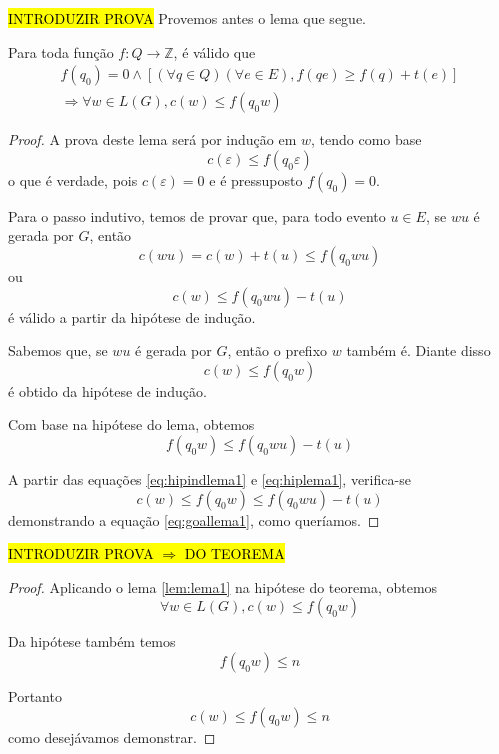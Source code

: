 \hl{INTRODUZIR PROVA} Provemos antes o lema que segue.

\begin{lem}
	\label{lem:lema1}
	Para toda função $f : Q \to \mathbb{Z}$, é válido que\begin{equation*}
	\begin{aligned}
	f(q_0) = 0 \wedge [(\forall q \in Q)(\forall e \in E), f(qe) \geq f(q) + t(e)]\\\Rightarrow \forall w \in L(G), c(w) \leq f(q_0w)
	\end{aligned}
	\end{equation*}
\end{lem}
\begin{proof}
A prova deste lema será por indução em $w$, tendo como base $$c(\varepsilon) \leq f(q_0\varepsilon)$$ o que é verdade, pois $c(\varepsilon) = 0$ e é pressuposto $f(q_0) = 0$.

Para o passo indutivo, temos de provar que, para todo evento $u \in E$, se $ wu$ é gerada por $G$, então $$c(wu) = c(w) + t(u) \leq f(q_0wu)$$ ou \begin{equation}
\label{eq:goallema1}
c(w) \leq f(q_0wu) - t(u)
\end{equation} é válido a partir da hipótese de indução.

Sabemos que, se $wu$ é gerada por $G$, então o prefixo $w$ também é. Diante disso \begin{equation}
\label{eq:hipindlema1}
c(w) \leq f(q_0w)
\end{equation} é obtido da hipótese de indução.

Com base na hipótese do lema, obtemos \begin{equation}
\label{eq:hiplema1}
f(q_0w) \leq f(q_0wu) - t(u)
\end{equation}

A partir das equações \ref{eq:hipindlema1} e \ref{eq:hiplema1}, verifica-se $$c(w) \leq f(q_0w) \leq f(q_0wu) - t(u)$$ demonstrando a equação \ref{eq:goallema1}, como queríamos.
\end{proof}

\hl{INTRODUZIR PROVA $\Rightarrow$ DO TEOREMA}

\begin{proof}
Aplicando o lema \ref{lem:lema1} na hipótese do teorema, obtemos $$\forall w \in L(G), c(w) \leq f(q_0w)$$

Da hipótese também temos $$f(q_0w) \leq n$$

Portanto $$c(w) \leq f(q_0w) \leq n$$ como desejávamos demonstrar.
\end{proof}


